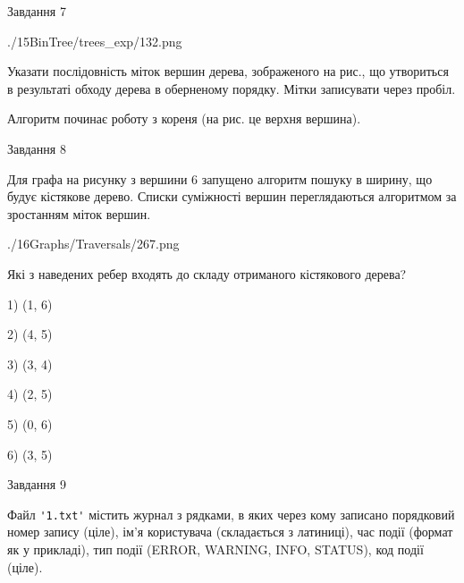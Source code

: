 \documentclass[12pt, ukrainian]{article}
\def\code#1{\Verb!#1!}
\begin{document}
{\vspace{10mm}\par

\newpage
\begin{minipage}[t]{9.7cm}
               
{\begin{center}Завдання {7}\end{center}}
\vspace{-6mm}

\begin{center}
	{./15BinTree/trees_exp/132.png}
\end{center}
Указати послідовність міток вершин дерева, зображеного на рис., що утвориться в результаті обходу дерева в оберненому порядку. Мітки записувати через пробіл.\par Алгоритм починає роботу з кореня (на рис. це верхня вершина).\par

\end{minipage}
\vline \hspace{8mm}
\begin{minipage}[t]{8.0cm}
               
{\begin{center}Завдання {8}\end{center}}
\vspace{-6mm}
Для графа на рисунку з вершини 6 запущено алгоритм пошуку в ширину, що будує кістякове дерево. Списки суміжності вершин переглядаються алгоритмом за зростанням міток вершин.\par
\begin{center}
	{./16Graphs/Traversals/267.png}
\end{center}
\par Які з наведених ребер входять до складу отриманого кістякового дерева?\par
1) (1, 6)\par
2) (4, 5)\par
3) (3, 4)\par
4) (2, 5)\par
5) (0, 6)\par
6) (3, 5)\par
{\vskip 15pt} \par

\end{minipage}

               
{\begin{center}Завдання {9}\end{center}}
\vspace{-6mm}
Файл \code{'1.txt'} містить журнал з рядками, в яких через кому записано поряд\-ко\-вий номер запису (ціле), ім'я користувача (складається з латиниці), час події (фор\-мат як у прикладі), тип події (ERROR, WARNING, INFO, STATUS), код події (ціле).

}
\end{document}
